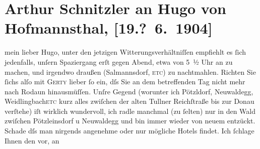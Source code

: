 

         \renewcommand{\erwaehnteWerke}{}
               \section[Arthur Schnitzler an Hugo von Hofmannsthal, {[}19.? 6. 1904{]}]{ Arthur Schnitzler an Hugo von Hofmannsthal, {[}19.? 6. 1904{]}}\nopagebreak{}\rehead{ }\begin{ledgroupsized}[t]{13cm}\normalsize\beginnumbering \toendnotes[C]{\smallbreak\pagebreak[2]} 
\toendnotes[C]{\smallbreak}\pstart{}{\pb}mein lieber Hugo, \pend\pstart
           unter den jetzigen Witterungsverhältniſſen empfiehlt es ſich jedenfalls, unſern
               Spaziergang erſt gegen Abend, etwa von 5 ½ Uhr an zu
               machen, und irgendwo draußen (Salmannsdorf, \textsc{etc}) zu nachtmahlen. Richten Sie ſichs alſo mit \textsc{Gerty} lieber ſo ein, dſs Sie an dem betreffenden Tag nicht mehr nach Rodaun hinausmüſſen. Unſre Gegend (worunter ich Pötzldorf, Neuwaldegg, {\pb}Weidlingbach\textsc{etc} kurz alles zwiſchen der alten Tullner Reichſtraße bis zur Donau verſtehe) iſt wirklich wundervoll, ich radle manchmal (zu
               ſelten) nur in den Wald zwiſchen Pötzleinsdorf u Neuwaldegg und bin immer wieder von neuem entzückt.
               Schade dſs man nirgends angenehme oder nur mögliche Hotels findet. Ich ſchlage Ihnen
               den \label{K_L01407_1v}\label{K_L01407_1h} vor, an

\end{ledgroupsized}
